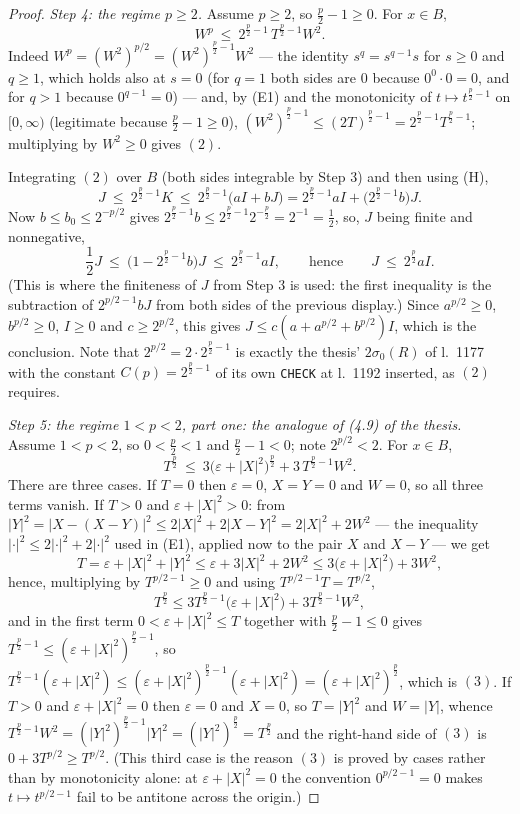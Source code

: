 \begin{proof}
\emph{Step 4: the regime $p\ge2$.}  Assume $p\ge2$, so $\frac p2-1\ge0$.  For
$x\in B$,
\[
W^p\ \le\ 2^{\frac p2-1}\,T^{\frac p2-1}W^2 .
\tag{2}
\]
Indeed $W^p=(W^2)^{p/2}=(W^2)^{\frac p2-1}W^2$ --- the identity
$s^{q}=s^{q-1}s$ for $s\ge0$ and $q\ge1$, which holds also at $s=0$ (for $q=1$
both sides are $0$ because $0^0\cdot0=0$, and for $q>1$ because $0^{q-1}=0$) ---
and, by (E1) and the monotonicity of $t\mapsto t^{\frac p2-1}$ on $[0,\infty)$
(legitimate because $\frac p2-1\ge0$),
$(W^2)^{\frac p2-1}\le(2T)^{\frac p2-1}=2^{\frac p2-1}T^{\frac p2-1}$;
multiplying by $W^2\ge0$ gives $(2)$.

Integrating $(2)$ over $B$ (both sides integrable by Step 3) and then using (H),
\[
J\ \le\ 2^{\frac p2-1}K\ \le\ 2^{\frac p2-1}\bigl(aI+bJ\bigr)
=2^{\frac p2-1}aI+\bigl(2^{\frac p2-1}b\bigr)J .
\]
Now $b\le b_0\le2^{-p/2}$ gives
$2^{\frac p2-1}b\le2^{\frac p2-1}2^{-\frac p2}=2^{-1}=\frac12$, so, $J$ being
finite and nonnegative,
\[
\frac12J\ \le\ \bigl(1-2^{\frac p2-1}b\bigr)J\ \le\ 2^{\frac p2-1}aI,
\qquad\text{hence}\qquad
J\ \le\ 2^{\frac p2}aI .
\]
(This is where the finiteness of $J$ from Step 3 is used: the first inequality
is the subtraction of $2^{p/2-1}bJ$ from both sides of the previous display.)
Since $a^{p/2}\ge0$, $b^{p/2}\ge0$, $I\ge0$ and $c\ge2^{p/2}$, this gives
$J\le c(a+a^{p/2}+b^{p/2})I$, which is the conclusion.  Note that
$2^{p/2}=2\cdot2^{\frac p2-1}$ is exactly the thesis' $2\sigma_0(R)$ of
l.~1177 with the constant $C(p)=2^{\frac p2-1}$ of its own \texttt{CHECK} at
l.~1192 inserted, as $(2)$ requires.

\emph{Step 5: the regime $1<p<2$, part one: the analogue of (4.9) of the thesis.}
Assume $1<p<2$, so $0<\frac p2<1$ and $\frac p2-1<0$; note $2^{p/2}<2$.  For
$x\in B$,
\[
T^{\frac p2}\ \le\ 3\bigl(\varepsilon+|X|^2\bigr)^{\frac p2}
+3\,T^{\frac p2-1}W^2 .
\tag{3}
\]
There are three cases.  If $T=0$ then $\varepsilon=0$, $X=Y=0$ and $W=0$, so all
three terms vanish.  If $T>0$ and $\varepsilon+|X|^2>0$: from
$|Y|^2=|X-(X-Y)|^2\le2|X|^2+2|X-Y|^2=2|X|^2+2W^2$ --- the inequality
$|\cdot|^2\le2|\cdot|^2+2|\cdot|^2$ used in (E1), applied now to the pair
$X$ and $X-Y$ --- we get
\[
T=\varepsilon+|X|^2+|Y|^2\le\varepsilon+3|X|^2+2W^2
\le3\bigl(\varepsilon+|X|^2\bigr)+3W^2 ,
\]
hence, multiplying by $T^{p/2-1}\ge0$ and using $T^{p/2-1}T=T^{p/2}$,
\[
T^{\frac p2}\le3T^{\frac p2-1}\bigl(\varepsilon+|X|^2\bigr)+3T^{\frac p2-1}W^2 ,
\]
and in the first term $0<\varepsilon+|X|^2\le T$ together with
$\frac p2-1\le0$ gives $T^{\frac p2-1}\le(\varepsilon+|X|^2)^{\frac p2-1}$, so
$T^{\frac p2-1}(\varepsilon+|X|^2)\le(\varepsilon+|X|^2)^{\frac p2-1}
(\varepsilon+|X|^2)=(\varepsilon+|X|^2)^{\frac p2}$, which is $(3)$.  If $T>0$
and $\varepsilon+|X|^2=0$ then $\varepsilon=0$ and $X=0$, so $T=|Y|^2$ and
$W=|Y|$, whence $T^{\frac p2-1}W^2=(|Y|^2)^{\frac p2-1}|Y|^2
=(|Y|^2)^{\frac p2}=T^{\frac p2}$ and the right-hand side of $(3)$ is
$0+3T^{p/2}\ge T^{p/2}$.  (This third case is the reason $(3)$ is proved by
cases rather than by monotonicity alone: at $\varepsilon+|X|^2=0$ the
convention $0^{p/2-1}=0$ makes $t\mapsto t^{p/2-1}$ fail to be antitone across
the origin.)


\end{proof}
